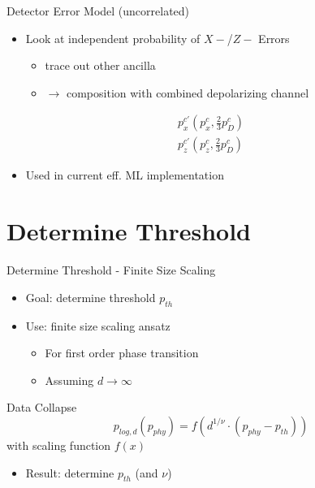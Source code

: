 \documentclass{beamer}
\begin{document}
\begin{frame}{Detector Error Model (uncorrelated)}
    \begin{itemize}
        \item Look at independent probability of $X-$/$Z-$ Errors
        \begin{itemize}
            \item trace out other ancilla 
            \item $\rightarrow$ composition with combined depolarizing channel
        \end{itemize}
    \end{itemize}
    \begin{align*}
        p^{c'}_x \left(p^{c}_x, \frac{2}{3}p^{c}_D\right)  \\
        p^{c'}_z \left(p^{c}_z, \frac{2}{3}p^{c}_D\right) 
    \end{align*}
    \begin{itemize}
        \item Used in current eff. ML implementation 
    \end{itemize}
\end{frame}

\section{Determine Threshold}
\begin{frame}{Determine Threshold - Finite Size Scaling}
    \begin{itemize}
        \item Goal: determine threshold $p_{th}$
        \item Use: finite size scaling ansatz
        \begin{itemize}
            \item For first order phase transition
            \item Assuming $d \rightarrow \infty$
        \end{itemize}
    \end{itemize}
    \begin{block}{Data Collapse}
    \begin{equation*}
        p_{log,d}(p_{phy}) = f\left( d^{1/\nu} \cdot(p_{phy}-p_{th})\right)
    \end{equation*}
with scaling function $f(x)$ 
    \end{block}
    \begin{itemize}
        \item Result: determine $p_{th}$ (and $\nu$) 
    \end{itemize}
\end{frame}
\end{document}
